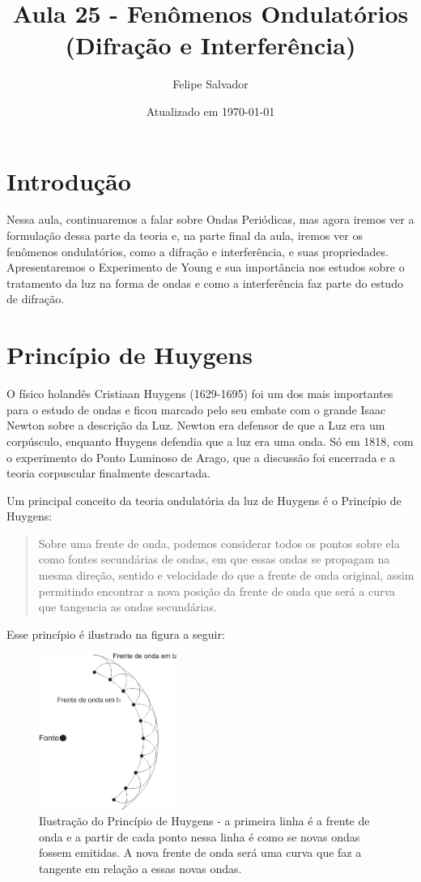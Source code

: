 \documentclass[12pt]{extarticle}
\title{Aula 25 - Fenômenos Ondulatórios (Difração e Interferência)}
\author{Felipe Salvador}
\date{Atualizado em \today}
\newcommand{\<}{\langle}
\renewcommand{\>}{\rangle}
\theoremstyle{definition}
\begin{document}
\maketitle

\section{Introdução}
Nessa aula, continuaremos a falar sobre Ondas Periódicas, mas agora iremos ver a formulação dessa parte da teoria e, na parte final da aula, iremos ver os fenômenos ondulatórios, como a difração e interferência, e suas propriedades. Apresentaremos o Experimento de Young e sua importância nos estudos sobre o tratamento da luz na forma de ondas e como a interferência faz parte do estudo de difração.

\section{Princípio de Huygens}
O físico holandês Cristiaan Huygens (1629-1695) foi um dos mais importantes para o estudo de ondas e ficou marcado pelo seu embate com o grande Isaac Newton sobre a descrição da Luz. Newton era defensor de que a Luz era um corpúsculo, enquanto Huygens defendia que a luz era uma onda. Só em 1818, com o experimento do Ponto Luminoso de Arago, que a discussão foi encerrada e a teoria corpuscular finalmente descartada.

Um principal conceito da teoria ondulatória da luz de Huygens é o Princípio de Huygens:
\begin{quote}
    Sobre uma frente de onda, podemos considerar todos os pontos sobre ela como fontes secundárias de ondas, em que essas ondas se propagam na mesma direção, sentido e velocidade do que a frente de onda original, assim permitindo encontrar a nova posição da frente de onda que será a curva que tangencia as ondas secundárias.
\end{quote}
Esse princípio é ilustrado na figura a seguir:
\begin{figure}[H]
    \centering
    \includegraphics[width=0.4\textwidth]{huygens.png}
    \caption{Ilustração do Princípio de Huygens - a primeira linha é a frente de onda e a partir de cada ponto nessa linha é como se novas ondas fossem emitidas. A nova frente de onda será uma curva que faz a tangente em relação a essas novas ondas.}
    \label{fig:huygens}
\end{figure}
\end{document}
